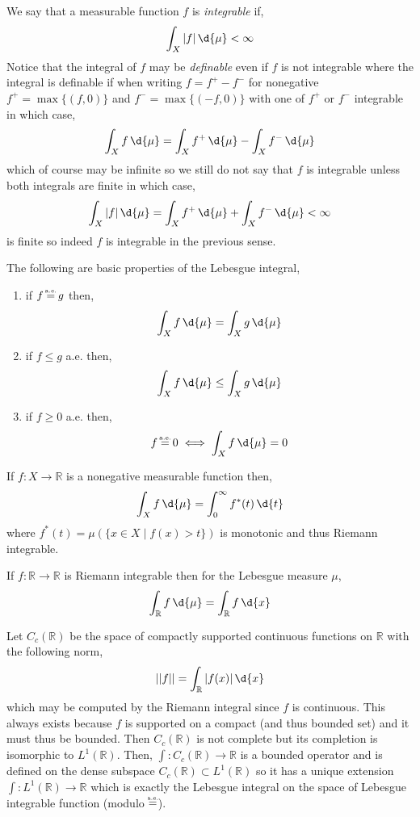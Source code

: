 \documentclass[12pt]{article}
\newcommand{\R}{\mathbb{R}}
\newcommand\eqae{\mathrel{\stackrel{\makebox[0pt]{\mbox{\normalfont\tiny a.e.}}}{=}}}
\begin{document}
\begin{defn}
We say that a measurable function $f$ is \textit{integrable} if,
\[ \int_X |f| \, \d{\mu} < \infty \]
Notice that the integral of $f$ may be \textit{definable} even if $f$ is not integrable where the integral is definable if when writing $f = f^+ - f^-$ for nonegative $f^+ = \max\{(f,0)\}$ and $f^- = \max\{(-f,0)\}$ with one of $f^+$ or $f^-$ integrable in which case,
\[ \int_X f \, \d{\mu} = \int_X f^+ \, \d{\mu} - \int_X f^- \, \d{\mu} \]
which of course may be infinite so we still do not say that $f$ is integrable unless both integrals are finite in which case,
\[ \int_X |f| \, \d{\mu} = \int_X f^+ \, \d{\mu} + \int_X f^{-} \, \d{\mu} < \infty \]
is finite so indeed $f$ is integrable in the previous sense.
\end{defn}

\begin{prop}
The following are basic properties of the Lebesgue integral,
\begin{enumerate}
\item if $f \eqae g$ then,
\[ \int_X f \, \d{\mu} = \int_X g \, \d{\mu} \]
\item if $f \le g$ a.e. then,
\[ \int_X f \, \d{\mu} \le \int_X g \, \d{\mu} \]
\item if $f \ge 0$ a.e. then,
\[ f \eqae 0 \iff \int_X f \, \d{\mu} = 0 \]
\end{enumerate} 
\end{prop}

\begin{thm}
If $f : X \to \R$ is a nonegative measurable function then,
\[ \int_X f \, \d{\mu} = \int_0^{\infty} f^*(t) \, \d{t} \]
where $f^*(t) = \mu(\{ x \in X \mid f(x) > t \})$ is monotonic and thus Riemann integrable.
\end{thm}

\begin{thm}
If $f : \R \to \R$ is Riemann integrable then for the Lebesgue measure $\mu$,
\[ \int_\R f \, \d{\mu} = \int_{\R} f \, \d{x} \]
\end{thm}

\begin{thm}
Let $C_c(\R)$ be the space of compactly supported continuous functions on $\R$ with the following norm,
\[ || f || = \int_{\R} |f(x)| \, \d{x} \]
which may be computed by the Riemann integral since $f$ is continuous. This always exists because $f$ is supported on a compact (and thus bounded set) and it must thus be bounded. Then $C_c(\R)$ is not complete but its completion is isomorphic to $L^1(\R)$. 
Then, $\int : C_c(\R) \to \R$ is a bounded operator and is defined on the dense subspace $C_c(\R) \subset L^1(\R)$ so it has a unique extension $\int : L^1(\R) \to \R$ which is exactly the Lebesgue integral on the space of Lebesgue integrable function (modulo $\eqae$).
\end{thm}
\end{document}
